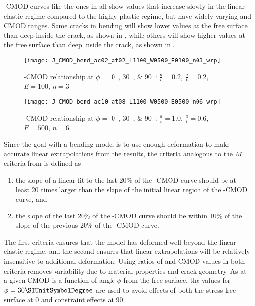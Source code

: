 \J{}-CMOD curves like the ones in  all show \J values that increase slowly in the linear elastic regime compared to the highly-plastic regime, but have widely varying \J and CMOD ranges.
Some cracks in bending will show lower \J values at the free surface than deep inside the crack, as shown in , while others will show higher \J values at the free surface than deep inside the crack, as shown in .
\begin{figure}[tbp]
\centering
\texttt{[image: J\_CMOD\_bend\_ac02\_at02\_L1100\_W0500\_E0100\_n03\_wrp]}
\caption{\J-CMOD relationship at \(\phi=\) \SIlist{0;30;90}{\SIUnitSymbolDegree}: \(\frac{a}{c}=0.2\), \(\frac{a}{t}=0.2\), \(E=100\), \(n=3\) \label{fig:J-phi-ac_02_at_02_E0100_n03}}
\end{figure}
\begin{figure}[tbp]
\centering
\texttt{[image: J\_CMOD\_bend\_ac10\_at08\_L1100\_W0500\_E0500\_n06\_wrp]}
\caption{\J-CMOD relationship at \(\phi=\) \SIlist{0;30;90}{\SIUnitSymbolDegree}: \(\frac{a}{c}=1.0\), \(\frac{a}{t}=0.6\), \(E=500\), \(n=6\) \label{fig:J-phi-ac_10_at_08_E0500_n06}}
\end{figure}
Since the goal with a bending model is to use enough deformation to make accurate linear extrapolations from the results, the criteria analogous to the \(M\) criteria from \cite{allenwells2014} is defined as
\begin{enumerate} \label{list:criteria}
\item the slope of a linear fit to the last 20\% of the \J-CMOD curve should be at least 20 times larger than the slope of the initial linear region of the \J-CMOD curve, and
\item the slope of the last 20\% of the \J-CMOD curve should be within 10\% of the slope of the previous 20\% of the \J-CMOD curve.
\end{enumerate}
The first criteria ensures that the model has deformed well beyond the linear elastic regime, and the second ensures that linear extrapolations will be relatively insensitive to additional deformation.
Using ratios of \J and CMOD values in both criteria removes variability due to material properties and crack geometry.
As \J at a given CMOD is a function of angle \(\phi\) from the free surface, the \J values for \(\phi=30{\SIUnitSymbolDegree}\) are used to avoid effects of both the stress-free surface at \SI{0}{\SIUnitSymbolDegree} and constraint effects at \SI{90}{\SIUnitSymbolDegree}.

